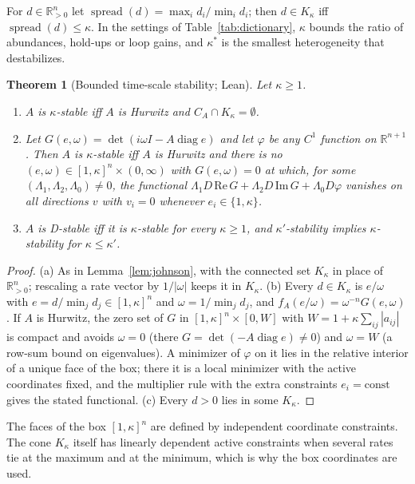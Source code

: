 \documentclass[11pt,a4paper]{article}
\theoremstyle{plain}
\newtheorem{theorem}{Theorem}[section]
\theoremstyle{definition}
\newcommand{\R}{\mathbb{R}}
\newcommand{\Rp}{\R^n_{>0}}
\newcommand{\diag}{\operatorname{diag}}
\newcommand{\spread}{\operatorname{spread}}
\newcommand{\Kk}{K_\kappa}
\newcommand{\ks}{\kappa^{*}}
\begin{document}
For $d\in\Rp$ let $\spread(d)=\max_id_i/\min_id_i$; then $d\in\Kk$ iff $\spread(d)\le\kappa$. In the settings of
Table~\ref{tab:dictionary}, $\kappa$ bounds the ratio of abundances, hold-ups or loop gains, and $\ks$ is the
smallest heterogeneity that destabilizes.

\begin{theorem}[Bounded time-scale stability; Lean]\label{thm:cone}
Let $\kappa\ge1$.
\begin{enumerate}[label=(\alph*)]
\item $A$ is $\kappa$-stable iff $A$ is Hurwitz and $C_A\cap\Kk=\emptyset$.
\item Let $G(e,\omega)=\det(i\omega I-A\diag e)$ and let $\varphi$ be any $C^1$ function on $\R^{n+1}$. Then $A$ is
$\kappa$-stable iff $A$ is Hurwitz and there is no $(e,\omega)\in[1,\kappa]^n\times(0,\infty)$ with
$G(e,\omega)=0$ at which, for some $(\Lambda_1,\Lambda_2,\Lambda_0)\neq0$, the functional
$\Lambda_1D\,\mathrm{Re}\,G+\Lambda_2D\,\mathrm{Im}\,G+\Lambda_0D\varphi$ vanishes on all directions $v$ with $v_i=0$
whenever $e_i\in\{1,\kappa\}$.
\item $A$ is D-stable iff it is $\kappa$-stable for every $\kappa\ge1$, and $\kappa'$-stability implies
$\kappa$-stability for $\kappa\le\kappa'$.
\end{enumerate}
\end{theorem}

\begin{proof}
(a) As in Lemma~\ref{lem:johnson}, with the connected set $\Kk$ in place of $\Rp$; rescaling a rate vector
by $1/|\omega|$ keeps it in $\Kk$. (b) Every $d\in\Kk$ is $e/\omega$ with $e=d/\min_jd_j\in[1,\kappa]^n$ and
$\omega=1/\min_jd_j$, and $f_A(e/\omega)=\omega^{-n}G(e,\omega)$. If $A$ is Hurwitz, the zero set of $G$ in
$[1,\kappa]^n\times[0,W]$ with $W=1+\kappa\sum_{ij}|a_{ij}|$ is compact and avoids $\omega=0$ (there
$G=\det(-A\diag e)\neq0$) and $\omega=W$ (a row-sum bound on eigenvalues). A minimizer of $\varphi$ on it lies
in the relative interior of a unique face of the box; there it is a local minimizer with the active
coordinates fixed, and the multiplier rule with the extra constraints $e_i=\mathrm{const}$ gives the stated
functional. (c) Every $d>0$ lies in some $\Kk$.
\end{proof}

The faces of the box $[1,\kappa]^n$ are defined by independent coordinate constraints. The cone $\Kk$ itself has
linearly dependent active constraints when several rates tie at the maximum and at the minimum, which is why the
box coordinates are used.
\end{document}
